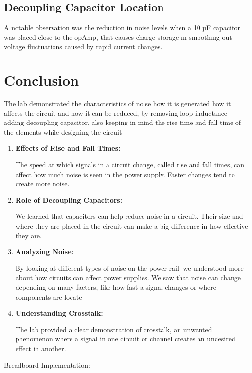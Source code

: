 \documentclass[a4paper,11pt]{article}%
\begin{document}
		\subsection{Decoupling Capacitor Location}
		
		A notable observation was the reduction in noise levels when a 10 µF capacitor was placed close to the opAmp, that causes charge storage in smoothing out voltage fluctuations caused by rapid current changes.




\section{Conclusion}

The lab demonstrated the characteristics of noise how it is generated how it affects the circuit and how it can be reduced, by removing loop inductance adding decoupling capacitor, also keeping in mind the rise time and fall time of the elements while designing the circuit

\begin{enumerate}
	\item \textbf{Effects of Rise and Fall Times:}

	The speed at which signals in a circuit change, called rise and fall times, can affect how much noise is seen in the power supply. Faster changes tend to create more noise.
	\item \textbf{Role of Decoupling Capacitors:}
	
	We learned that capacitors can help reduce noise in a circuit. Their size and where they are placed in the circuit can make a big difference in how effective they are.
	\item\textbf{Analyzing Noise:}
	
	By looking at different types of noise on the power rail, we understood more about how circuits can affect power supplies. We saw that noise can change depending on many factors, like how fast a signal changes or where components are locate

	\item \textbf{Understanding Crosstalk:}

	The lab provided a clear demonstration of crosstalk, an unwanted phenomenon where a signal in one circuit or channel creates an undesired effect in another.
\end{enumerate}


Breadboard Implementation:
\end{document}
